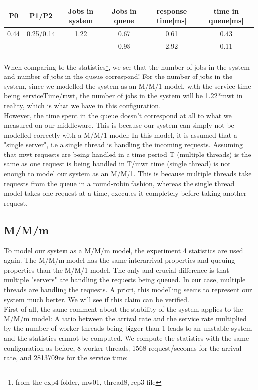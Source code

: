 \documentclass[11pt,a4paper]{article}
\begin{document}
\begin{center}

		\begin{tabular}{|c|c|c|c|c|c|}
			  \hline
			  \textbf{P0} & \textbf{P1/P2} & \textbf{Jobs in system} & \textbf{Jobs in queue} & \textbf{response time[ms]} & \textbf{time in queue[ms]}\\
			  \hline
			  0.44 & 0.25/0.14 & 1.22 & 0.67 & 0.61 & 0.43 \\
			  - & - & - & 0.98  & 2.92 & 0.11 \\
			  \hline
		\end{tabular}
 
\end{center}
\newpage
 When comparing to the statistics\footnote{from the exp4 folder, mw01, thread8, rep3 file}, we see that the number of jobs in the system and number of jobs in the queue correspond! For the number of jobs in the system, since we modelled the system as an M/M/1 model, with the service time being serviceTime/mwt, the number of jobs in the system will be 1.22*mwt in reality, which is what we have in this configuration. 
 \\
However, the time spent in the queue doesn't correspond at all to what we measured on our middleware. This is because our system can simply not be modelled correctly with a M/M/1 model: In this model, it is assumed that a "single server", i.e a single thread is handling the incoming requests. Assuming that mwt requests are being handled in a time period T (multiple threads) is the same as one request is being handled in T/mwt time (single thread) is not enough to model our system as an M/M/1. This is because multiple threads take requests from the queue in a round-robin fashion, whereas the single thread model takes one request at a time, executes it completely before taking another request. 

  
\subsection{M/M/m}

To model our system as a M/M/m model, the experiment 4 statistics are used again.
The M/M/m model has the same interarrival properties and queuing properties than the M/M/1 model. The only and crucial difference is that multiple "servers" are handling the requests being queued. In our case, multiple threads are handling the requests. A priori, this modelling seems to represent our system much better. We will see if this claim can be verified. 
\\
First of all, the same comment about the stability of the system applies to the M/M/m model: A ratio between the arrival rate and the service rate multiplied by the number of worker threads being bigger than 1 leads to an unstable system and the statistics cannot be computed. We compute the statistics with the same configuration as before, 8 worker threads, 1568 request/seconds for the arrival rate, and 2813709ns for the service time:
\end{document}
